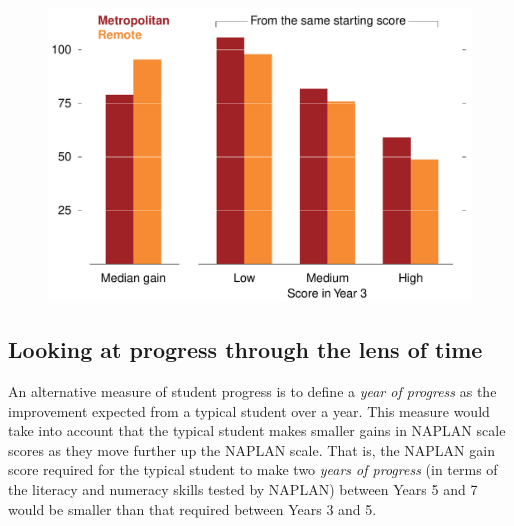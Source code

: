 \begin{figure}[H]
 \includegraphics[width=\columnwidth]{atlas/remote_metro.pdf}\label{fig:remote_metro}

\end{figure}

\newpage

\subsection{Looking at progress through the lens of time}

An alternative measure of student progress is to define a \textit{year of progress} as the improvement expected from a typical student over a year. This measure would take into account that the typical student makes smaller gains in NAPLAN scale scores as they move further up the NAPLAN scale. That is, the NAPLAN gain score required for the typical student to make two \textit{years of progress} (in terms of the literacy and numeracy skills tested by NAPLAN) between Years 5 and 7 would be smaller than that required between Years 3 and 5.

